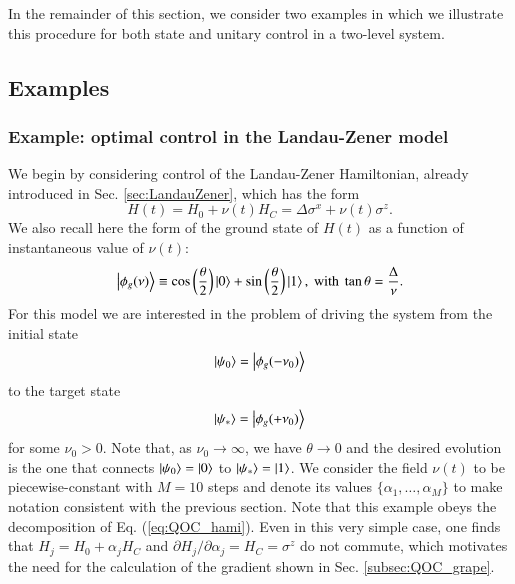In the remainder of this section, we consider two examples in which we illustrate this procedure for both state and unitary control in a two-level system.


\subsection{Examples}
\subsubsection{Example: optimal control in the Landau-Zener model}
\label{subsec:QOC_example_state}
We begin by considering control of the Landau-Zener Hamiltonian, already introduced in Sec. \ref{sec:LandauZener}, which has the form 
\begin{equation}
    H(t) = H_0 + \nu(t) H_C = \Delta \sigma^x + \nu(t) \sigma^z.
    \label{eq:QOC_hami_LZ}
\end{equation}
We also recall here the form of the ground state of $H(t)$ as a function of instantaneous value of $\nu(t)$:
\begin{equation}
    \ket{\phi_g(\nu)} \equiv \cos\left(\frac{\theta}{2}\right) \ket{0}+\sin\left(\frac{\theta}{2}\right) \ket{1},\ \text{with}\ \tan\theta = \frac{\Delta}{\nu}.
\end{equation}
For this model we are interested in the problem of driving the system from the initial state 
\begin{equation}
    \ket{\psi_0}=\ket{\phi_g(-\nu_0)}
\end{equation}
to the target state
\begin{equation}
    \ket{\psi_\ast}=\ket{\phi_g(+\nu_0)}
\end{equation}
for some $\nu_0>0$. Note that, as $\nu_0\rightarrow \infty$, we have $\theta\rightarrow 0 $ and the desired evolution is the one that connects $\ket{\psi_0}=\ket{0}$ to $\ket{\psi_\ast}=\ket{1}$. We consider the field $\nu(t)$ to be piecewise-constant with $M=10$ steps and denote its values $\{\alpha_1,\ldots,\alpha_M\}$ to make notation consistent with the previous section. Note that this example obeys the decomposition of Eq. (\ref{eq:QOC_hami}). Even in this very simple case, one finds that $H_j = H_0+\alpha_j H_C$ and $\partial H_j/\partial \alpha_j=H_C=\sigma^z$ do not commute, which motivates the need for the calculation of the gradient shown in Sec. \ref{subsec:QOC_grape}.\\

